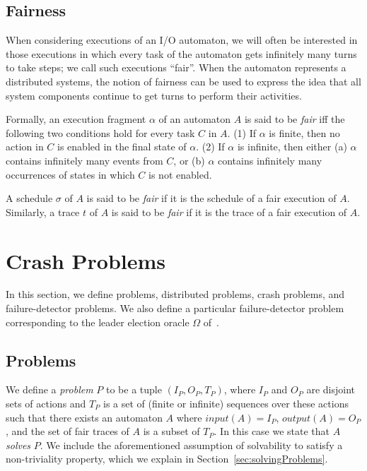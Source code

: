 \documentclass[11pt]{article}
\numberwithin{theorem}{section}
\begin{document}
\subsection{Fairness}
\label{sec: IOA: fairness}

When considering executions of an I/O automaton, we will often be
interested in those executions in which every task of the automaton
gets infinitely many turns to take steps; we call such executions
``fair''.
When the automaton represents a distributed systems, the notion of
fairness can be used to express the idea that all system components
continue to get turns to perform their activities.

Formally, an execution fragment $\alpha$ of an automaton $A$ is said
to be \emph{fair} iff the following two conditions hold for
every task $C$ in $A$. (1) If $\alpha$ is finite, then no action in
$C$ is enabled in the final state of $\alpha$. (2) If $\alpha$ is
infinite, then either (a) $\alpha$ contains infinitely many events
from $C$, or (b) $\alpha$ contains infinitely many occurrences of
states in which $C$ is not enabled.

A schedule $\sigma$ of $A$ is said to be \emph{fair} if it is the
schedule of a fair execution of $A$. 
Similarly, a trace $t$ of $A$ is said to be \emph{fair} if it is the
trace of a fair execution of $A$.



\section{Crash Problems}

In this section, we define problems, distributed problems,
crash problems, and failure-detector problems.
We also define a particular failure-detector problem corresponding to
the leader election oracle $\Omega$ of~\cite{chan:twfdf}.

\subsection{Problems} 
\label{subsec:problems}

We define a \emph{problem} $P$ to be a tuple $(I_P,O_P,T_P)$, where
$I_P$ and $O_P$ are disjoint sets of actions and $T_P$ is a set of
(finite or infinite) sequences over these actions such that there
exists an automaton $A$ where $input(A) = I_P$, $output(A) = O_P$, and
the set of fair traces of $A$ is a subset of $T_P$.  
In this case we state that $A$ \emph{solves} $P$.
We include the aforementioned assumption of solvability to satisfy a non-triviality
property, which we explain in Section~\ref{sec:solvingProblems}.
\end{document}
